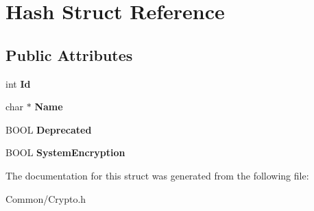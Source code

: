 \hypertarget{struct_hash}{}\section{Hash Struct Reference}
\label{struct_hash}
\subsection*{Public Attributes}
\begin{DoxyCompactItemize}
\item 
\mbox{\label{struct_hash_aeccc4a01a812875c2b0a1be5fd4ff479}} 
int {\bfseries Id}
\item 
\mbox{\label{struct_hash_adf9d7d5bc452b147ad48ae2452826dcd}} 
char $\ast$ {\bfseries Name}
\item 
\mbox{\label{struct_hash_afbc3ca8ecca1e0941651bc38287788b6}} 
B\+O\+OL {\bfseries Deprecated}
\item 
\mbox{\label{struct_hash_ad7fa6d11e28d72fe1360bc428e2c5414}} 
B\+O\+OL {\bfseries System\+Encryption}
\end{DoxyCompactItemize}


The documentation for this struct was generated from the following file\+:\begin{DoxyCompactItemize}
\item 
Common/Crypto.\+h\end{DoxyCompactItemize}

